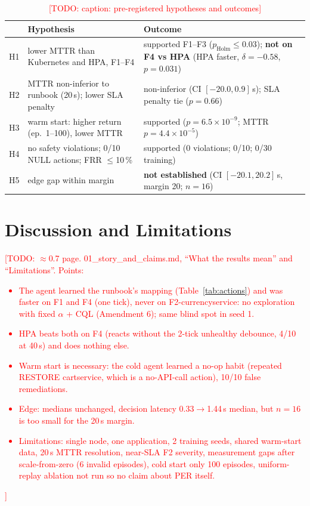 \documentclass[conference,10pt]{IEEEtran}
\newcommand{\todo}[1]{\textcolor{red}{[TODO: #1]}}
\begin{document}
\begin{table}[t]
\centering
\caption{\todo{caption: pre-registered hypotheses and outcomes}}
\label{tab:hyp}
\setlength{\tabcolsep}{2.5pt}
\begin{tabular}{@{}p{}p{}p{}@{}}
\toprule
 & Hypothesis & Outcome \\
\midrule
H1 & lower MTTR than Kubernetes and HPA, F1--F4 & supported F1--F3 ($p_{\mathrm{Holm}}\le0.03$); \textbf{not on F4 vs HPA} (HPA faster, $\delta=-0.58$, $p=0.031$) \\
H2 & MTTR non-inferior to runbook (20\,s); lower SLA penalty & non-inferior (CI $[-20.0, 0.9]$\,s); SLA penalty tie ($p=0.66$) \\
H3 & warm start: higher return (ep.\ 1--100), lower MTTR & supported ($p=6.5\times10^{-9}$; MTTR $p=4.4\times10^{-5}$) \\
H4 & no safety violations; 0/10 NULL actions; FRR $\le$10\,\% & supported (0 violations; 0/10; 0/30 training) \\
H5 & edge gap within margin & \textbf{not established} (CI $[-20.1, 20.2]$\,s, margin 20; $n=16$) \\
\bottomrule
\end{tabular}
\end{table}

\section{Discussion and Limitations}\label{sec:discussion}
\todo{$\approx$0.7 page. 01\_story\_and\_claims.md, ``What the results mean'' and ``Limitations''. Points:
\begin{itemize}
\item The agent learned the runbook's mapping (Table~\ref{tab:actions}) and was faster on F1 and F4 (one tick), never on F2-currencyservice: no exploration with fixed $\alpha$ + CQL (Amendment 6); same blind spot in seed 1.
\item HPA beats both on F4 (reacts without the 2-tick unhealthy debounce, 4/10 at 40\,s) and does nothing else.
\item Warm start is necessary: the cold agent learned a no-op habit (repeated RESTORE cartservice, which is a no-API-call action), 10/10 false remediations.
\item Edge: medians unchanged, decision latency 0.33$\rightarrow$1.44\,s median, but $n=16$ is too small for the 20\,s margin.
\item Limitations: single node, one application, 2 training seeds, shared warm-start data, 20\,s MTTR resolution, near-SLA F2 severity, measurement gaps after scale-from-zero (6 invalid episodes), cold start only 100 episodes, uniform-replay ablation not run so no claim about PER itself.
\end{itemize}}
\end{document}
